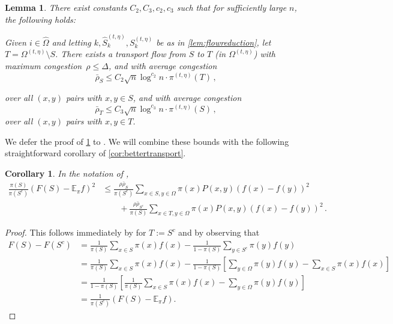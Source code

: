 \documentclass[a4paper, 12p]{article}
\numberwithin{equation}{section}
\newcommand{\Exp}{\mathbb{E}}
\newcommand{\FF}{F}
\newcommand{\Omorproj}{\hat{\Omega}}
\newtheorem{lemma}[theorem]{Lemma}
\newtheorem{corollary}[theorem]{Corollary}
\begin{document}
\begin{lemma}\label{lem:proj_flow}
     There exist constants $C_2, C_3, c_2, c_3$ such that for sufficiently large $n$, the following holds:
     
     Given $i \in \Omorproj$ and letting $k, \hat S_k^{(t,\eta)}, S_k^{(t,\eta)}$ be as in \cref{lem:flowreduction}, let $T = \Omega^{(t,\eta)} \setminus S$. There exists a transport flow from $S$ to $T$ (in $\Omega^{(t, \eta)}$) with maximum congestion~$\rho \leq \Delta$, and with average congestion 
     \[
     \bar\rho_S \leq C_2 \sqrt n \log^{c_2} n \cdot \pi^{(t,\eta)}(T)\,,\]
     
     over all $(x, y)$ pairs with $x, y \in S$, and with average congestion
     \[
        \bar\rho_T \leq C_3 \sqrt n \log^{c_3} n \cdot \pi^{(t,\eta)}(S)\,,
    \]
    over all $(x, y)$ pairs with $x, y \in T$.
\end{lemma}
We defer the proof of \cref{lem:proj_flow} to .
We will combine these bounds with the following straightforward corollary of \cref{cor:bettertransport}.
\begin{corollary}\label{cor:bettertransport2}
In the notation of ,
    \begin{align}
    \frac{\pi(S)}{\pi(S^c)}(\FF(S) - \Exp_\pi f)^2 &\leq \frac{\rho \bar\rho_S}{\pi(S^c)}\sum_{x \in S, y \in \Omega}\pi(x)P(x, y)(f(x) - f(y))^2 \nonumber \\
    &\quad\quad+ \frac{\rho \bar\rho_{S^c}}{\pi(S)}\sum_{x \in T, y \in \Omega}\pi(x)P(x, y)(f(x) - f(y))^2\,.\label{eqn:bettertransport2}
\end{align}
\end{corollary}
\begin{proof}
    This follows immediately by  for $T:=S^c$ and by observing that
    \begin{align*}
        F(S)-F(S^c)&=\frac{1}{\pi(S)}\sum_{x\in S}\pi(x)f(x)-\frac{1}{1-\pi(S)}\sum_{y\in S^c}\pi(y)f(y)\\
        &=\frac{1}{\pi(S)}\sum_{x\in S}\pi(x)f(x)-\frac{1}{1-\pi(S)}\left[\sum_{y\in \Omega}\pi(y)f(y)-\sum_{x\in S}\pi(x)f(x)\right]\\
        &=\frac{1}{1-\pi(S)}\left[\frac{1}{\pi(S)}\sum_{x\in S}\pi(x)f(x)-\sum_{y\in \Omega}\pi(y)f(y)\right]\\
        &=\frac{1}{\pi(S^c)}(F(S)-\Exp_\pi f).
    \end{align*}
\end{proof}
\end{document}
